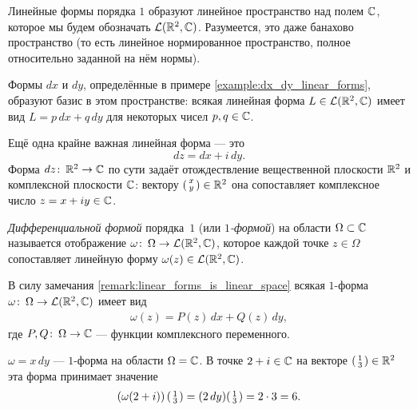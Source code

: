 \documentclass[../complex-analysis.tex]{subfiles}
\begin{document}
\begin{remrk}
 \label{remark:linear_forms_is_linear_space}
 Линейные формы порядка $ 1 $ образуют линейное пространство над полем $\mathbb{C}$, которое мы будем обозначать $\mathcal{L}(\mathbb{R}^2, \mathbb{C})$. Разумеется, это даже банахово пространство (то есть линейное нормированное пространство, полное относительно заданной на нём нормы).

 Формы $dx$ и $dy$, определённые в примере \ref{example:dx_dy_linear_forms}, образуют базис в этом пространстве: всякая линейная форма $ L \in \mathcal{L}(\mathbb{R}^2, \mathbb{C}) $ имеет вид $L = p\,dx + q\,dy$ для некоторых чисел $p,q \in \mathbb{C}$.
\end{remrk}

\begin{exmpl}
 Ещё одна крайне важная линейная форма --- это \[
  dz = dx + i\,dy.
  \] Форма $ dz \colon\,\mathbb{R}^{2} \to \mathbb{C} $ по сути задаёт отождествление вещественной плоскости $ \mathbb{R}^{2} $ и комплексной плоскости $ \mathbb{C} $: вектору $ \begin{psmallmatrix}
  x \\ y
 \end{psmallmatrix} \in \mathbb{R}^{2} $ она сопоставляет комплексное число $ z = x + iy \in \mathbb{C} $.
\end{exmpl}

\begin{df}
 \textit{Дифференциальной формой} порядка~$1$ (или \textit{$1$-формой}) на области $ \Omega \subset \mathbb{C} $ называется отображение $\omega \colon\, \Omega \to \mathcal{L}(\mathbb{R}^2, \mathbb{C})$, которое каждой точке $z \in \Omega$ сопоставляет линейную форму $\omega(z) \in \mathcal{L}(\mathbb{R}^2, \mathbb{C})$.
\end{df}

\begin{remrk}
 В силу замечания \ref{remark:linear_forms_is_linear_space} всякая $1$-форма $\omega \colon\, \Omega \to \mathcal{L}(\mathbb{R}^2, \mathbb{C})$ имеет вид
 \begin{align}
  \label{equation:1-form}
  \omega(z) = P(z)\,dx + Q(z)\,dy
 ,\end{align} где $P, Q \colon\, \Omega \to \mathbb{C}$ --- функции комплексного переменного.
\end{remrk}

\begin{exmpl*}
 $\omega = x \, dy$ --- $1$-форма на области $ \Omega = \mathbb{C} $. В точке $2 + i \in \mathbb{C}$ на векторе $ \begin{psmallmatrix}
  1 \\ 3
 \end{psmallmatrix} \in \mathbb{R}^{2}$ эта форма принимает значение
 \begin{align*}
  \left(\omega (2 + i)\right) \begin{psmallmatrix}
   1 \\ 3
   \end{psmallmatrix}= (2 \, dy) \begin{psmallmatrix}
   1 \\ 3
  \end{psmallmatrix} = 2 \cdot 3 = 6
 .\end{align*} 
\end{exmpl*}
\end{document}

